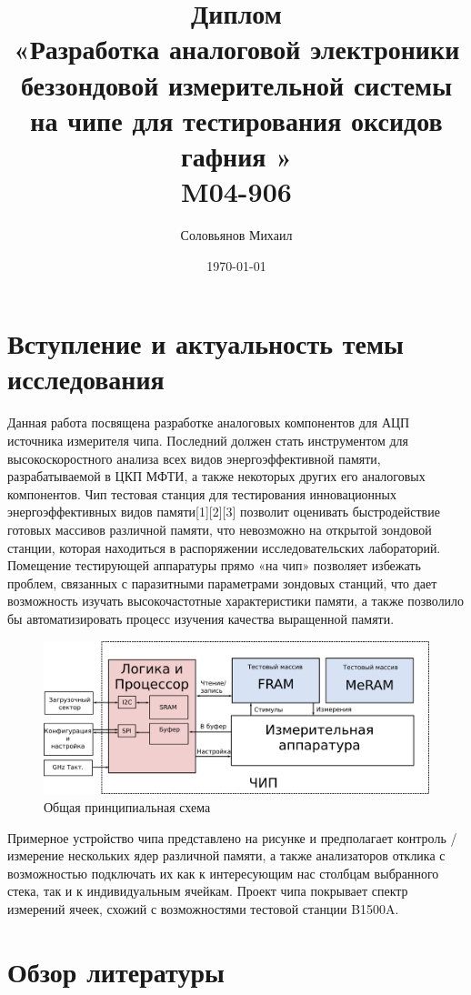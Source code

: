\documentclass[a4paper,12pt]{article} %
\author{Соловьянов Михаил}
\title{Диплом \\ \LARGE{«Разработка аналоговой электроники беззондовой измерительной системы на чипе для тестирования оксидов гафния
»\\ M04-906}}
\date{\today}
\begin{document}

\tableofcontents
{}
\newpage



\section{Вступление и актуальность темы исследования}


Данная работа посвящена разработке аналоговых компонентов для АЦП источника измерителя чипа. Последний должен  стать инструментом для высокоскоростного  анализа всех видов энергоэффективной памяти, разрабатываемой в ЦКП МФТИ, а также некоторых других его аналоговых компонентов. Чип тестовая станция для тестирования инновационных энергоэффективных видов памяти[1][2][3] позволит оценивать быстродействие готовых массивов различной памяти, что невозможно на открытой зондовой станции, которая находиться в распоряжении исследовательских лабораторий. Помещение тестирующей аппаратуры прямо «на чип» позволяет избежать проблем, связанных с паразитными параметрами зондовых станций, что дает возможность изучать высокочастотные характеристики памяти, а также позволило бы автоматизировать процесс изучения качества выращенной памяти.



\begin{figure}[H]
    \includegraphics[width=\textwidth]{top_ru.png}
    \caption{Общая принципиальная схема}
    \label{pic:top_ru}
\end{figure}

Примерное устройство чипа представлено на рисунке и предполагает контроль / измерение нескольких ядер различной памяти, а также анализаторов отклика с возможностью подключать их как к интересующим нас столбцам выбранного стека, так и к индивидуальным ячейкам. Проект чипа покрывает спектр измерений ячеек, схожий с возможностями тестовой станции B1500A.

\section{Обзор литературы}
\end{document}

